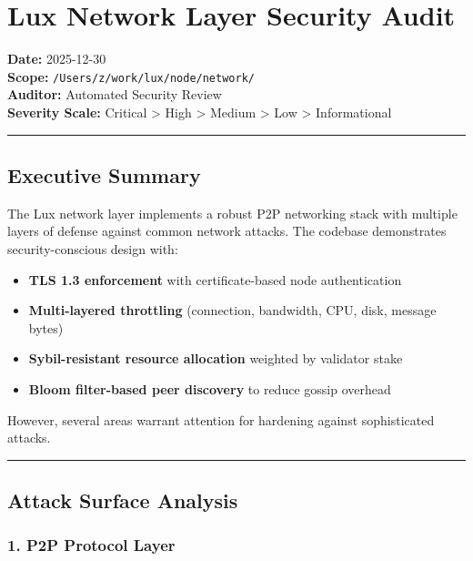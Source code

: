 \documentclass[
]{article}
\author{}
\date{}
\providecommand{\tightlist}{%
  \setlength{\itemsep}{0pt}\setlength{\parskip}{0pt}}
\begin{document}
\section{Lux Network Layer Security
Audit}\label{lux-network-layer-security-audit}

\textbf{Date:} 2025-12-30\\
\textbf{Scope:} \texttt{/Users/z/work/lux/node/network/}\\
\textbf{Auditor:} Automated Security Review\\
\textbf{Severity Scale:} Critical \textgreater{} High \textgreater{}
Medium \textgreater{} Low \textgreater{} Informational

\begin{center}\rule{0.5\linewidth}{0.5pt}\end{center}

\subsection{Executive Summary}\label{executive-summary}

The Lux network layer implements a robust P2P networking stack with
multiple layers of defense against common network attacks. The codebase
demonstrates security-conscious design with:

\begin{itemize}
\tightlist
\item
  \textbf{TLS 1.3 enforcement} with certificate-based node
  authentication
\item
  \textbf{Multi-layered throttling} (connection, bandwidth, CPU, disk,
  message bytes)
\item
  \textbf{Sybil-resistant resource allocation} weighted by validator
  stake
\item
  \textbf{Bloom filter-based peer discovery} to reduce gossip overhead
\end{itemize}

However, several areas warrant attention for hardening against
sophisticated attacks.

\begin{center}\rule{0.5\linewidth}{0.5pt}\end{center}

\subsection{Attack Surface Analysis}\label{attack-surface-analysis}

\subsubsection{1. P2P Protocol Layer}\label{1-p2p-protocol-layer}
\end{document}
